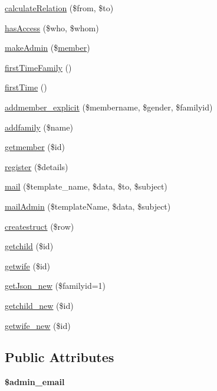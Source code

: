 \begin{DoxyCompactItemize}
\item 
\hyperlink{classvanshavali_aac633019986e8d90d915ddafb772e26e}{calculate\-Relation} (\$from, \$to)
\item 
\hyperlink{classvanshavali_a1603b138202edbe428836fe91ddd23c4}{has\-Access} (\$who, \$whom)
\item 
\hyperlink{classvanshavali_a9bf310bbd46feca98b4c5b568575b6d4}{make\-Admin} (\$\hyperlink{classmember}{member})
\item 
\hyperlink{classvanshavali_a1d43abd82aa27e69dadbab48492801f0}{first\-Time\-Family} ()
\item 
\hyperlink{classvanshavali_a0b4f7c8e20e73e16bb9505ac0cae4817}{first\-Time} ()
\item 
\hyperlink{classvanshavali_a0ae3b4be4f88572f7780304504c39dbc}{addmember\-\_\-explicit} (\$membername, \$gender, \$familyid)
\item 
\hyperlink{classvanshavali_a0e2dc92ebdd355f1e995976f79285d1b}{addfamily} (\$name)
\item 
\hyperlink{classvanshavali_a91783e3f043278513c32ec2cca7f4c15}{getmember} (\$id)
\item 
\hyperlink{classvanshavali_a3de4f0b21ee02db0c12053d359543561}{register} (\$details)
\item 
\hyperlink{classvanshavali_aba5843e1d503de982e31f1366cef2abb}{mail} (\$template\-\_\-name, \$data, \$to, \$subject)
\item 
\hyperlink{classvanshavali_affea231be22eb26920637ec41b5dab04}{mail\-Admin} (\$template\-Name, \$data, \$subject)
\item 
\hyperlink{classvanshavali_a221c06bb6df817d86b784fddbada6855}{createstruct} (\$row)
\item 
\hyperlink{classvanshavali_a9f7d7e7137457aefbbd85ac33c5c1372}{getchild} (\$id)
\item 
\hyperlink{classvanshavali_a3ff1ca4043648fa9961a6fe2c1f94087}{getwife} (\$id)
\item 
\hyperlink{classvanshavali_aaff3d01d67e94c2371c39adabf1aba1e}{get\-Json\-\_\-new} (\$familyid=1)
\item 
\hyperlink{classvanshavali_adf31d7537f11e2235d6ffdcc7e8b11e7}{getchild\-\_\-new} (\$id)
\item 
\hyperlink{classvanshavali_ac63d3c3e833350cc3af38d9ba335be4c}{getwife\-\_\-new} (\$id)
\end{DoxyCompactItemize}
\subsection*{Public Attributes}
\begin{DoxyCompactItemize}
\item 
\hypertarget{classvanshavali_a8a53647182677d9f2f6f76a0dfd79b0f}{{\bfseries \$admin\-\_\-email}}\label{classvanshavali_a8a53647182677d9f2f6f76a0dfd79b0f}

\end{DoxyCompactItemize}
